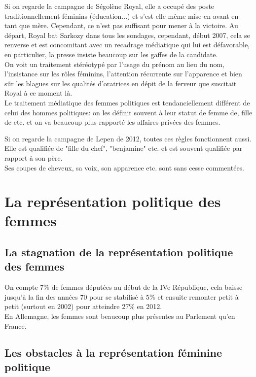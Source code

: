 \documentclass[10pt, a4paper, openany]{book}
\begin{document}
Si on regarde la campagne de Ségolène Royal, elle a occupé des poste traditionnellement féminins (éducation...) et s'est elle même mise en avant en tant que mère. Cependant, ce n'est pas suffisant pour mener à la victoire. Au départ, Royal bat Sarkozy dans tous les sondages, cependant, début 2007, cela se renverse et est concomitant avec un recadrage médiatique qui lui est défavorable, en particulier, la presse insiste beaucoup sur les gaffes de la candidate. \\
On voit un traitement stéréotypé par l'usage du prénom au lieu du nom, l'insistance sur les rôles féminins, l'attention récurrente sur l'apparence et bien sûr les blagues sur les qualités d'oratrices en dépit de la ferveur que suscitait Royal à ce moment là. \\
Le traitement médiatique des femmes politiques est tendanciellement différent de celui des hommes politiques: on les définit souvent à leur statut de femme de, fille de etc. et on va beaucoup plus rapporté les affaires privées des femmes. 


Si on regarde la campagne de Lepen de 2012, toutes ces règles fonctionnent aussi. Elle est qualifiée de "fille du chef", "benjamine" etc. et est souvent qualifiée par rapport à son père. \\
Ses coupes de cheveux, sa voix, son apparence etc. sont sans cesse commentées. 

\section{La représentation politique des femmes}

\subsection{La stagnation de la représentation politique des femmes}

On compte 7\% de femmes députées au début de la IVe République, cela baisse jusqu'à la fin des années 70 pour se stabilisé à 5\% et ensuite remonter petit à petit (surtout en 2002) pour atteindre 27\% en 2012. \\
En Allemagne, les femmes sont beaucoup plus présentes au Parlement qu'en France. 

\subsection{Les obstacles à la représentation féminine politique}
\end{document}
